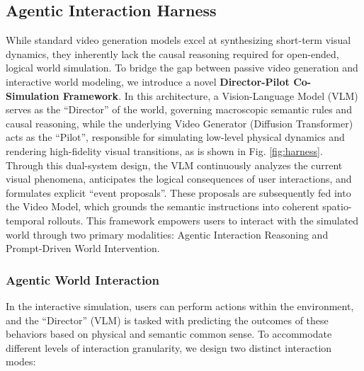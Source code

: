 \subsection{Agentic Interaction Harness}
\label{subsec:interactive_event_proposal}

While standard video generation models excel at synthesizing short-term visual dynamics, they inherently lack the causal reasoning required for open-ended, logical world simulation. To bridge the gap between passive video generation and interactive world modeling, we introduce a novel \textbf{Director-Pilot Co-Simulation Framework}. In this architecture, a Vision-Language Model (VLM) serves as the ``Director'' of the world, governing macroscopic semantic rules and causal reasoning, while the underlying Video Generator (Diffusion Transformer) acts as the ``Pilot'', responsible for simulating low-level physical dynamics and rendering high-fidelity visual transitions, as is shown in Fig. \ref{fig:harness}. 
%
Through this dual-system design, the VLM continuously analyzes the current visual phenomena, anticipates the logical consequences of user interactions, and formulates explicit ``event proposals''. These proposals are subsequently fed into the Video Model, which grounds the semantic instructions into coherent spatio-temporal rollouts. This framework empowers users to interact with the simulated world through two primary modalities: Agentic Interaction Reasoning and Prompt-Driven World Intervention.

\subsubsection{Agentic World Interaction}
In the interactive simulation, users can perform actions within the environment, and the ``Director'' (VLM) is tasked with predicting the outcomes of these behaviors based on physical and semantic common sense. To accommodate different levels of interaction granularity, we design two distinct interaction modes:

